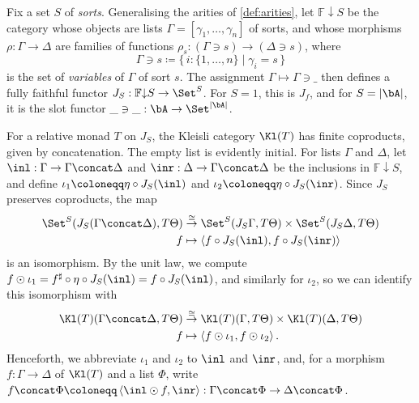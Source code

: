\begin{definition}
    Fix a set $S$ of \emph{sorts}. Generalising the arities of \cref{def:arities}, let $\mathbb{F}{\downarrow}S$ be the category whose objects are lists $\Gamma = [\gamma_1, \ldots, \gamma_n]$ of sorts, and whose morphisms $\rho : \Gamma \to \Delta$ are families of functions $\rho_s : (\Gamma \ni s) \to (\Delta \ni s)$, where
    \[
    \Gamma \ni s \coloneqq \{\, i : \{1, \ldots, n\} \mid \gamma_i = s \,\}
    \]
    is the set of \emph{variables} of $\Gamma$ of sort $s$. The assignment $\Gamma \mapsto \Gamma \ni \_$ then defines a fully faithful functor $J_S : \mathbb{F}{\downarrow}S \to \Set^S$. For $S = 1$, this is $J_f$, and for $S = \left|\bA\right|$, it is the slot functor $\_ \ni \_ : \bA \to \Set^{\left|\bA\right|}$.
\end{definition}
        
\begin{remark}\label{rem:kleisli-coproducts}
    For a relative monad $T$ on $J_S$, the Kleisli category $\Kl(T)$ has finite coproducts, given by concatenation. The empty list is evidently initial. 
    For lists $\Gamma$ and $\Delta$, let $\inl : \Gamma \to \Gamma \concat \Delta$ and $\inr : \Delta \to \Gamma \concat \Delta$ be the inclusions in $\mathbb{F}{\downarrow}S$, and define $\iota_1 \coloneqq \eta \circ J_S(\inl)$ and $\iota_2 \coloneqq \eta \circ J_S(\inr)$. Since $J_S$ preserves coproducts, the map
    \begin{align*}
        \Set^S(J_S(\Gamma\concat\Delta),T\Theta) &\overset{\cong}{\to} \Set^S(J_S\Gamma,T\Theta) \times \Set^S(J_S\Delta,T\Theta)\\
        f &\mapsto \left<f \circ J_S(\inl), f \circ J_S(\inr)\right> 
    \end{align*}
    is an isomorphism. By the unit law, we compute $f \odot \iota_1 = f^{\sharp} \circ \eta \circ J_S(\inl) = f \circ J_S(\inl)$, and similarly for $\iota_2$, so we can identify this isomorphism with
    \begin{align*}
        \Kl(T)(\Gamma\concat\Delta,T\Theta) &\overset{\cong}{\to} \Kl(T)(\Gamma,T\Theta) \times \Kl(T)(\Delta,T\Theta)\\
        f &\mapsto \left<f \odot \iota_1, f \odot \iota_2\right>.
    \end{align*}
    Henceforth, we abbreviate $\iota_1$ and $\iota_2$ to $\inl$ and $\inr$, and, for a morphism $f : \Gamma \to \Delta$ of $\Kl(T)$ and a list $\Phi$, write $f \concat \Phi \coloneqq \left<\inl \odot f, \inr\right> : \Gamma \concat \Phi \to \Delta \concat \Phi$.
\end{remark}
    
